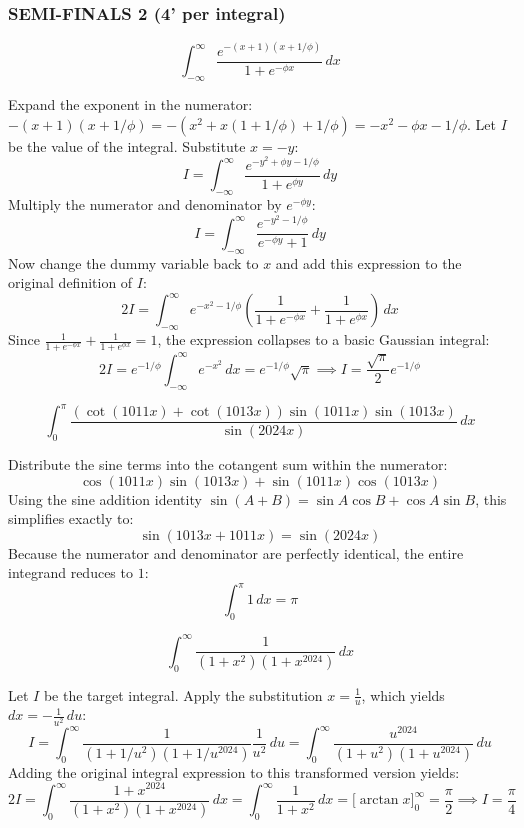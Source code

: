 \subsubsection*{SEMI-FINALS 2 (4' per integral)}
\begin{questions}

    \question \[ \int_{-\infty}^{\infty} \frac{e^{-(x+1)(x+1/\phi)}}{1 + e^{-\phi x}} \,dx \]
    \begin{solution}
        Expand the exponent in the numerator: $-(x+1)(x+1/\phi) = -(x^2 + x(1+1/\phi) + 1/\phi) = -x^2 - \phi x - 1/\phi$. Let $I$ be the value of the integral. Substitute $x = -y$:
        \[ I = \int_{-\infty}^{\infty} \frac{e^{-y^2 + \phi y - 1/\phi}}{1 + e^{\phi y}} \,dy \]
        Multiply the numerator and denominator by $e^{-\phi y}$:
        \[ I = \int_{-\infty}^{\infty} \frac{e^{-y^2 - 1/\phi}}{e^{-\phi y} + 1} \,dy \]
        Now change the dummy variable back to $x$ and add this expression to the original definition of $I$:
        \[ 2I = \int_{-\infty}^{\infty} e^{-x^2 - 1/\phi} \left( \frac{1}{1+e^{-\phi x}} + \frac{1}{1+e^{\phi x}} \right) \,dx \]
        Since $\frac{1}{1+e^{-\phi x}} + \frac{1}{1+e^{\phi x}} = 1$, the expression collapses to a basic Gaussian integral:
        \[ 2I = e^{-1/\phi} \int_{-\infty}^{\infty} e^{-x^2} \,dx = e^{-1/\phi}\sqrt{\pi} \implies I = \frac{\sqrt{\pi}}{2}e^{-1/\phi} \]
    \end{solution}

    \question \[ \int_{0}^{\pi} \frac{(\cot(1011x) + \cot(1013x))\sin(1011x)\sin(1013x)}{\sin(2024x)} \,dx \]
    \begin{solution}
        Distribute the sine terms into the cotangent sum within the numerator:
        \[ \cos(1011x)\sin(1013x) + \sin(1011x)\cos(1013x) \]
        Using the sine addition identity $\sin(A+B) = \sin A\cos B + \cos A\sin B$, this simplifies exactly to:
        \[ \sin(1013x + 1011x) = \sin(2024x) \]
        Because the numerator and denominator are perfectly identical, the entire integrand reduces to $1$:
        \[ \int_{0}^{\pi} 1 \,dx = \pi \]
    \end{solution}

    \question \[ \int_{0}^{\infty} \frac{1}{(1 + x^2)(1 + x^{2024})} \,dx \]
    \begin{solution}
        Let $I$ be the target integral. Apply the substitution $x = \frac{1}{u}$, which yields $dx = -\frac{1}{u^2} \,du$:
        \[ I = \int_{0}^{\infty} \frac{1}{(1 + 1/u^2)(1 + 1/u^{2024})} \frac{1}{u^2} \,du = \int_{0}^{\infty} \frac{u^{2024}}{(1+u^2)(1+u^{2024})} \,du \]
        Adding the original integral expression to this transformed version yields:
        \[ 2I = \int_{0}^{\infty} \frac{1 + x^{2024}}{(1+x^2)(1+x^{2024})} \,dx = \int_{0}^{\infty} \frac{1}{1 + x^2} \,dx = \Big[ \arctan x \Big]_0^\infty = \frac{\pi}{2} \implies I = \frac{\pi}{4} \]
    \end{solution}


\end{questions}
